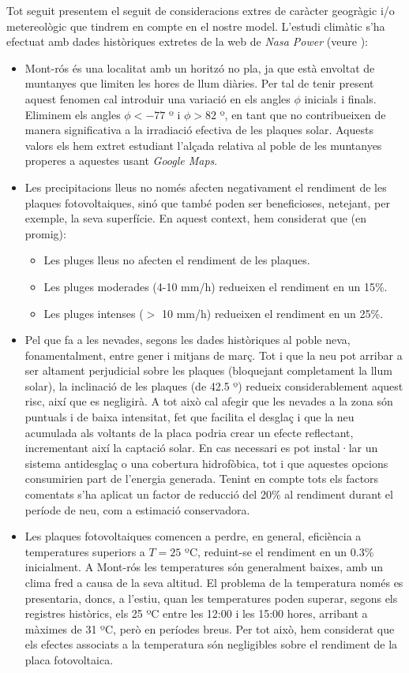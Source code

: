\documentclass[10pt, twoside, a4paper]{article}
\begin{document}
Tot seguit presentem el seguit de consideracions extres de caràcter geogràgic i/o metereològic que tindrem en compte en el nostre model. L'estudi climàtic s'ha efectuat amb dades històriques extretes de la web de \textit{Nasa Power} (veure \cite{ref6}):
\begin{itemize}
    \item Mont-rós és una localitat amb un horitzó no pla, ja que està envoltat de muntanyes que limiten les hores de llum diàries. Per tal de tenir present aquest fenomen cal introduir una variació en els angles $\phi$ inicials i finals. Eliminem els angles $\phi < -77$ º i $\phi > 82$ º, en tant que no contribueixen de manera significativa a la irradiació efectiva de les plaques solar. Aquests valors els hem extret estudiant l'alçada relativa al poble de les muntanyes properes a aquestes usant \textit{Google Maps}. 
    \item Les precipitacions lleus no només afecten negativament el rendiment de les plaques fotovoltaiques, sinó que també poden ser beneficioses, netejant, per exemple, la seva superfície. En aquest context, hem considerat que (en promig):
    \begin{itemize}
        \item Les pluges lleus no afecten el rendiment de les plaques.
        \item Les pluges moderades (4-10 mm/h) redueixen el rendiment en un 15\%.
        \item Les pluges intenses ($>$ 10 mm/h) redueixen el rendiment en un 25\%.
    \end{itemize}
    \item Pel que fa a les nevades, segons les dades històriques al poble neva, fonamentalment, entre gener i mitjans de març. Tot i que la neu pot arribar a ser altament perjudicial sobre les plaques (bloquejant completament la llum solar), la inclinació de les plaques (de 42.5 º) redueix considerablement aquest risc, així que es negligirà. A tot això cal afegir que les nevades a la zona són puntuals i de baixa intensitat, fet que facilita el desglaç i que la neu acumulada als voltants de la placa podria crear un efecte reflectant, incrementant així la captació solar.
    En cas necessari es pot instal·lar un sistema antidesglaç o una cobertura hidrofòbica, tot i que aquestes opcions consumirien part de l'energia generada. 
    Tenint en compte tots els factors comentats s'ha aplicat un factor de reducció del 20\% al rendiment durant el període de neu, com a estimació conservadora.
    \item Les plaques fotovoltaiques comencen a perdre, en general, eficiència a temperatures superiors a $T=25$ ºC, reduint-se el rendiment en un 0.3\% inicialment. A Mont-rós les temperatures són generalment baixes, amb un clima fred a causa de la seva altitud. El problema de la temperatura només es presentaria, doncs, a l'estiu, quan les temperatures poden superar, segons els registres històrics, els 25 ºC entre les 12:00 i les 15:00 hores, arribant a màximes de 31 ºC, però en períodes breus. 
    Per tot això, hem considerat que els efectes associats a la temperatura són negligibles sobre el rendiment de la placa fotovoltaica.
\end{itemize}
\end{document}
